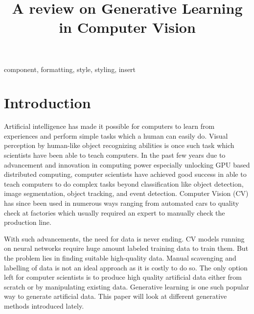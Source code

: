 \documentclass[conference]{IEEEtran}
\begin{document}
\title{A review on Generative Learning in Computer Vision}

\author{
}

\maketitle

\begin{abstract}

\end{abstract}

\begin{IEEEkeywords}
component, formatting, style, styling, insert
\end{IEEEkeywords}

\section{Introduction}
Artificial intelligence has made it possible for computers to learn from experiences and perform simple tasks which a human can easily do. Visual perception by human-like object recognizing abilities is once such task which scientists have been able to teach computers. In the past few years due to advancement and innovation in computing power especially unlocking GPU based distributed computing, computer scientists have achieved good success in able to teach computers to do complex tasks beyond classification like object detection, image segmentation, object tracking, and event detection. Computer Vision (CV) has since been used in numerous ways ranging from automated cars to quality check at factories which usually required an expert to manually check the production line.

With such advancements, the need for data is never ending. CV models running on neural networks require huge amount labeled training data to train them. But the problem lies in finding suitable high-quality data. Manual scavenging and labelling of data is not an ideal approach as it is costly to do so. The only option left for computer scientists is to produce high quality artificial data either from scratch or by manipulating existing data. Generative learning is one such popular way to generate artificial data. This paper will look at different generative methods introduced lately.
\end{document}
